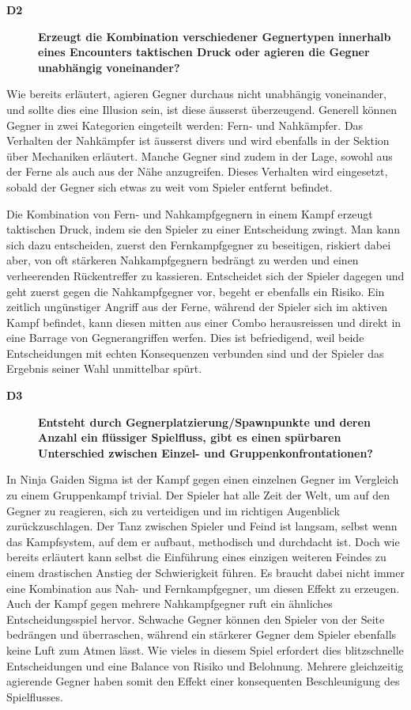 \documentclass[../Main.tex]{subfiles}
\begin{document}
\begin{description}
  \item[\textbf{D2}] \textbf{Erzeugt die Kombination verschiedener Gegnertypen innerhalb eines Encounters taktischen Druck oder agieren die Gegner unabhängig voneinander?}
\end{description}

Wie bereits erläutert, agieren Gegner durchaus nicht unabhängig voneinander, und sollte dies eine Illusion sein, ist diese äusserst überzeugend. Generell können Gegner in zwei Kategorien eingeteilt werden: Fern- und Nahkämpfer. Das Verhalten der Nahkämpfer ist äusserst divers und wird ebenfalls in der Sektion über Mechaniken erläutert. Manche Gegner sind zudem in der Lage, sowohl aus der Ferne als auch aus der Nähe anzugreifen. Dieses Verhalten wird eingesetzt, sobald der Gegner sich etwas zu weit vom Spieler entfernt befindet.

Die Kombination von Fern- und Nahkampfgegnern in einem Kampf erzeugt taktischen Druck, indem sie den Spieler zu einer Entscheidung zwingt. Man kann sich dazu entscheiden, zuerst den Fernkampfgegner zu beseitigen, riskiert dabei aber, von oft stärkeren Nahkampfgegnern bedrängt zu werden und einen verheerenden Rückentreffer zu kassieren. Entscheidet sich der Spieler dagegen und geht zuerst gegen die Nahkampfgegner vor, begeht er ebenfalls ein Risiko. Ein zeitlich ungünstiger Angriff aus der Ferne, während der Spieler sich im aktiven Kampf befindet, kann diesen mitten aus einer Combo herausreissen und direkt in eine Barrage von Gegnerangriffen werfen. Dies ist befriedigend, weil beide Entscheidungen mit echten Konsequenzen verbunden sind und der Spieler das Ergebnis seiner Wahl unmittelbar spürt.

\begin{description}
  \item[\textbf{D3}] \textbf{Entsteht durch Gegnerplatzierung/Spawnpunkte und deren Anzahl ein flüssiger Spielfluss, gibt es einen spürbaren Unterschied zwischen Einzel- und Gruppenkonfrontationen?}
\end{description}

In Ninja Gaiden Sigma ist der Kampf gegen einen einzelnen Gegner im Vergleich zu einem Gruppenkampf trivial. Der Spieler hat alle Zeit der Welt, um auf den Gegner zu reagieren, sich zu verteidigen und im richtigen Augenblick zurückzuschlagen. Der Tanz zwischen Spieler und Feind ist langsam, selbst wenn das Kampfsystem, auf dem er aufbaut, methodisch und durchdacht ist. Doch wie bereits erläutert kann selbst die Einführung eines einzigen weiteren Feindes zu einem drastischen Anstieg der Schwierigkeit führen. Es braucht dabei nicht immer eine Kombination aus Nah- und Fernkampfgegner, um diesen Effekt zu erzeugen. Auch der Kampf gegen mehrere Nahkampfgegner ruft ein ähnliches Entscheidungsspiel hervor. Schwache Gegner können den Spieler von der Seite bedrängen und überraschen, während ein stärkerer Gegner dem Spieler ebenfalls keine Luft zum Atmen lässt. Wie vieles in diesem Spiel erfordert dies blitzschnelle Entscheidungen und eine Balance von Risiko und Belohnung. Mehrere gleichzeitig agierende Gegner haben somit den Effekt einer konsequenten Beschleunigung des Spielflusses.
\end{document}

